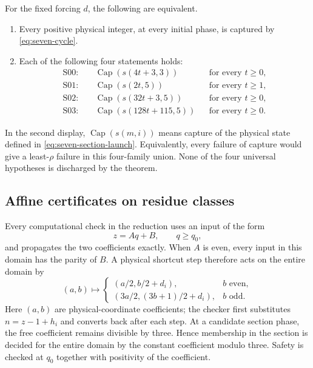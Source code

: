 \begin{theorem}
\label{thm:seven-four}
For the fixed forcing $d$, the following are equivalent.
\begin{enumerate}
\item Every positive physical integer, at every initial phase, is captured
by \eqref{eq:seven-cycle}.
\item Each of the following four statements holds:
\begin{align*}
 \mathrm{S00}:&\quad
 \operatorname{Cap}(s(4t+3,3))\quad &&\text{for every }t\ge0,\\
 \mathrm{S01}:&\quad
 \operatorname{Cap}(s(2t,5)) &&\text{for every }t\ge1,\\
 \mathrm{S02}:&\quad
 \operatorname{Cap}(s(32t+3,5)) &&\text{for every }t\ge0,\\
 \mathrm{S03}:&\quad
 \operatorname{Cap}(s(128t+115,5)) &&\text{for every }t\ge0.
\end{align*}
\end{enumerate}
In the second display, $\operatorname{Cap}(s(m,i))$ means capture of the
physical state defined in \eqref{eq:seven-section-launch}.  Equivalently,
every failure of capture would give a least-$\rho$ failure in this
four-family union.  None of the four universal hypotheses is discharged
by the theorem.
\end{theorem}

\subsection{Affine certificates on residue classes}

Every computational check in the reduction uses an input of the form
\[
 z=Aq+B,\qquad q\ge q_0,
\]
and propagates the two coefficients exactly.  When $A$ is even, every
input in this domain has the parity of $B$.  A physical shortcut step
therefore acts on the entire domain by
\[
 (a,b)\longmapsto
 \begin{cases}
 (a/2,b/2+d_i),&b\text{ even},\\
 (3a/2,(3b+1)/2+d_i),&b\text{ odd}.
 \end{cases}
\]
Here $(a,b)$ are physical-coordinate coefficients; the checker first
substitutes $n=z-1+h_i$ and converts back after each step.  At a candidate
section phase, the free coefficient remains divisible by three.  Hence
membership in the section is decided for the entire domain by the
constant coefficient modulo three.  Safety is checked at $q_0$ together
with positivity of the coefficient.

